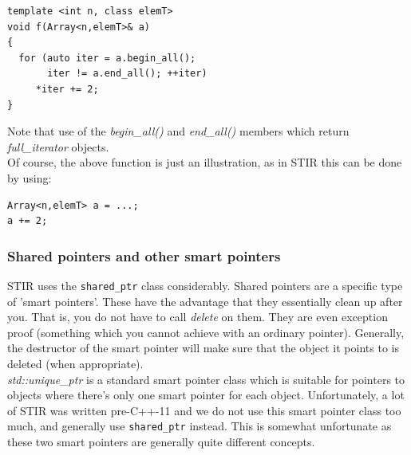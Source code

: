 \documentclass{article}
\begin{document}
\begin{verbatim}
template <int n, class elemT>
void f(Array<n,elemT>& a)
{
  for (auto iter = a.begin_all(); 
       iter != a.end_all(); ++iter)
     *iter += 2;
}
\end{verbatim}

Note that use of the \textit{begin\_all()} and \textit{end\_all()} members 
which return \textit{full\_iterator} objects. \\
Of course, the above function is just an illustration, as in 
STIR this can be done by using:


\begin{verbatim}
Array<n,elemT> a = ...;
a += 2;
\end{verbatim}


\subsubsection{
Shared pointers and other smart pointers \label{sect:sharedptr}}

STIR uses the \texttt{shared\_ptr} class considerably. Shared pointers 
are a specific type of 'smart pointers'. These have the advantage 
that they essentially clean up after you. That is, you do not 
have to call \textit{delete} on them. They are even exception proof 
(something which you cannot achieve with an ordinary pointer). 
Generally, the destructor of the smart pointer will make sure 
that the object it points to is deleted (when appropriate).\\
\textit{std::unique\_ptr} is a standard smart pointer class which is 
suitable for pointers to objects where there's only one smart 
pointer for each object. Unfortunately, a lot of STIR was written
pre-C++-11 and we do not use this smart pointer class too much, and 
generally use \texttt{shared\_ptr} instead. This is somewhat unfortunate 
as these two smart pointers are generally quite different concepts. 
\end{document}
